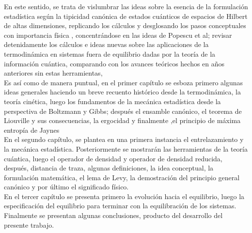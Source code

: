 En este sentido, se trata de vislumbrar las ideas sobre la esencia de la formulación estadística según la tipicidad canónica de estados cuánticos de espacios  de Hilbert  de altas dimensiones, replicando los cálculos y desglosando los pasos conceptuales con importancia física , concentrándose en las ideas de Popescu et al; revisar detenidamente los cálculos e ideas nuevas  sobre las aplicaciones de la termodinámica en sistemas fuera de equilibrio dadas por la teoría de la información cuántica, comparando con los avances teóricos  hechos en años anteriores  sin estas herramientas,
\\
Es así como de manera puntual, en el primer capítulo se esboza primero algunas ideas generales haciendo un breve recuento histórico desde la termodinámica, la teoría cinética, luego los fundamentos de la mecánica estadística desde la perspectiva de Boltzmann y Gibbs; después  el ensamble canónico, el teorema de Liouville  y sus consecuencias, la ergocidad  y finalmente ,el principio de máxima entropía de Jaynes     
\\
En el segundo capítulo, se plantea en una primera instancia el entrelazamiento y la mecánica estadística. Posteriormente se mostrarán las herramientas de la teoría cuántica, luego el operador de densidad y operador de densidad reducida, después, distancia de traza, algunas definiciones, la idea conceptual, la formulación matemática, el lema de Levy, la demostración del principio general canónico y por último el significado físico.
\\
En el tercer capítulo se presenta primero la evolución hacia el equilibrio, luego la especificación del equilibrio para terminar con la equilibración de los sistemas.
\\
Finalmente se presentan algunas conclusiones, producto del desarrollo del presente trabajo. 

